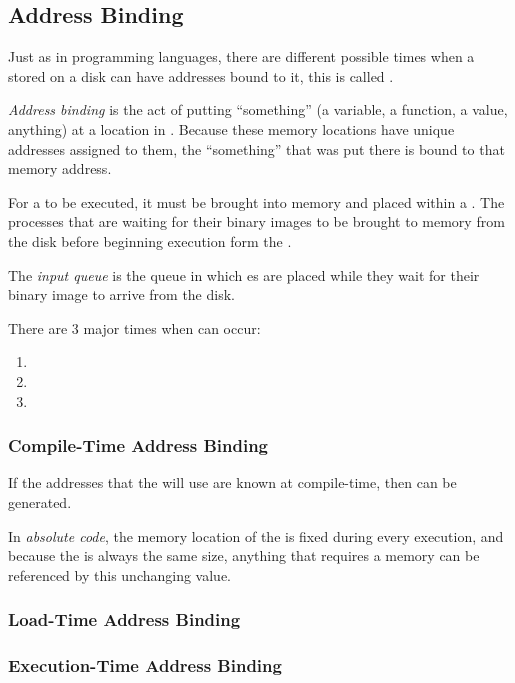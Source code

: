 \subsection{Address Binding}\label{subsec:Address_Binding}
Just as in programming languages, there are different possible times when a  stored on a disk can have  addresses bound to it, this is called .

\begin{definition}\label{def:Address_Binding}
  \emph{Address binding} is the act of putting ``something'' (a variable, a function, a value, anything) at a location in .
  Because these memory locations have unique addresses assigned to them, the ``something'' that was put there is bound to that memory address.
\end{definition}

For a  to be executed, it must be brought into memory and placed within a .
The processes that are waiting for their binary images to be brought to memory from the disk before beginning execution form the .

\begin{definition}\label{def:Input_Queue}
  The \emph{input queue} is the queue in which es are placed while they wait for their  binary image to arrive from the disk.
\end{definition}

There are 3 major times when  can occur:
\begin{enumerate}[noitemsep]
\item {}
\item {}
\item {}
\end{enumerate}

\subsubsection{Compile-Time Address Binding}\label{subsubsec:Compile_Time_Address_Binding}
If the addresses that the  will use are known at compile-time, then  can be generated.

\begin{definition}\label{def:Absolute_Code}
  In \emph{absolute code}, the memory location of the  is fixed during every execution, and because the  is always the same size, anything that requires a memory can be referenced by this unchanging value.
\end{definition}

\subsubsection{Load-Time Address Binding}\label{subsubsec:Load_Time_Address_Binding}
\subsubsection{Execution-Time Address Binding}\label{subsubsec:Execution_Time_Address_Binding}

